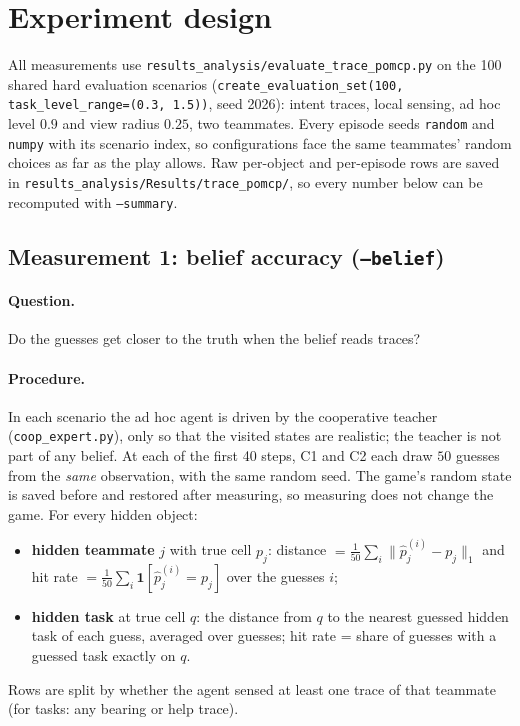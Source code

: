 \documentclass[11pt,a4paper]{article}
\newcommand{\file}{\nolinkurl}  %
\newcommand{\code}[1]{\texttt{#1}}
\theoremstyle{remark}
\begin{document}
\section{Experiment design}
\label{sec:design}

All measurements use \file{results_analysis/evaluate_trace_pomcp.py} on the 100 shared hard evaluation scenarios
(\code{create\_evaluation\_set(100, task\_level\_range=(0.3, 1.5))}, seed 2026): intent traces, local sensing, ad hoc
level $0.9$ and view radius $0.25$, two teammates. Every episode seeds \code{random} and \code{numpy} with its scenario
index, so configurations face the same teammates' random choices as far as the play allows. Raw per-object and
per-episode rows are saved in \file{results_analysis/Results/trace_pomcp/}, so every number below can be recomputed with
\code{--summary}.

\subsection{Measurement 1: belief accuracy (\code{--belief})}

\paragraph{Question.} Do the guesses get closer to the truth when the belief reads traces?

\paragraph{Procedure.} In each scenario the ad hoc agent is driven by the cooperative teacher (\file{coop_expert.py}),
only so that the visited states are realistic; the teacher is not part of any belief. At each of the first 40 steps,
C1 and C2 each draw $50$ guesses from the \emph{same} observation, with the same random seed. The game's random state is
saved before and restored after measuring, so measuring does not change the game. For every hidden object:
\begin{itemize}[nosep]
  \item \textbf{hidden teammate} $j$ with true cell $p_j$: distance $=\frac1{50}\sum_{i}\lVert \hat p^{(i)}_j - p_j\rVert_1$
        and hit rate $=\frac1{50}\sum_i \mathbf 1[\hat p^{(i)}_j = p_j]$ over the guesses $i$;
  \item \textbf{hidden task} at true cell $q$: the distance from $q$ to the nearest guessed hidden task of each guess,
        averaged over guesses; hit rate = share of guesses with a guessed task exactly on $q$.
\end{itemize}
Rows are split by whether the agent sensed at least one trace of that teammate (for tasks: any bearing or help trace).
\end{document}
